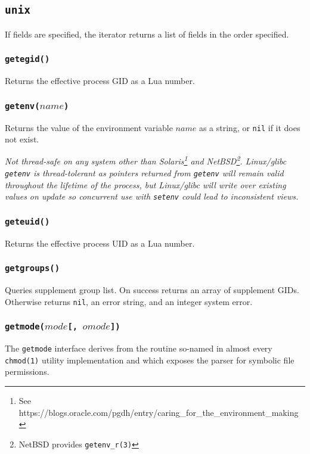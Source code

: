 \documentclass[11pt, oneside]{memoir}
\newcommand*{\nil}[0]{\texttt{nil}\xspace}
\newcommand*{\syscall}[1]{\texttt{#1}\xspace}
\newcommand*{\fn}[1]{\texttt{#1}\xspace}
\newcounter{toccols}
\newenvironment{Module}[1]{
	\subsection{\texttt{#1}}
	\addtocontents{toc}{
		\protect\begin{multicols}{\value{toccols}}
	}
}{
	\addtocontents{toc}{\protect\end{multicols}}
}
\begin{document}
\begin{Module}{unix}
If fields are specified, the iterator returns a list of fields in the order specified.

\subsubsection[\fn{getegid}]{\fn{getegid()}}

Returns the effective process GID as a Lua number.

\subsubsection[\fn{getenv}]{\fn{getenv($name$)}}

Returns the value of the environment variable $name$ as a string, or \nil if it does not exist.

\emph{Not thread-safe on any system other than Solaris\footnote{See https://blogs.oracle.com/pgdh/entry/caring\_for\_the\_environment\_making} and NetBSD\footnote{NetBSD provides \syscall{getenv\_r(3)}}. Linux/glibc \fn{getenv} is thread-tolerant as pointers returned from \syscall{getenv} will remain valid throughout the lifetime of the process, but Linux/glibc will write over existing values on update so concurrent use with \fn{setenv} could lead to inconsistent views.}

\subsubsection[\fn{geteuid}]{\fn{geteuid()}}

Returns the effective process UID as a Lua number.

\subsubsection[\fn{getgroups}]{\fn{getgroups()}}

Queries supplement group list. On success returns an array of supplement GIDs. Otherwise returns \nil, an error string, and an integer system error.

\subsubsection[\fn{getmode}]{\fn{getmode($mode$[, $omode$])}}

The \fn{getmode} interface derives from the routine so-named in almost every \texttt{chmod(1)} utility implementation and which exposes the parser for symbolic file permissions.


\end{Module}
\end{document}

